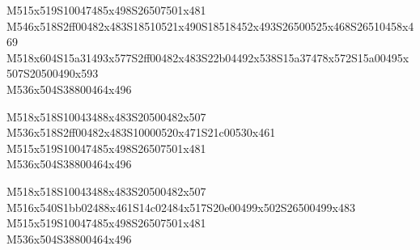 \documentclass{article}
\begin{document}
\begin{multicols}{5}
\begin{center}
M515x519S10047485x498S26507501x481 %
\\M546x518S2ff00482x483S18510521x490S18518452x493S26500525x468S26510458x469 %
\\M518x604S15a31493x577S2ff00482x483S22b04492x538S15a37478x572S15a00495x507S20500490x593 %
\\M536x504S38800464x496 %

M518x518S10043488x483S20500482x507 %
\\M536x518S2ff00482x483S10000520x471S21c00530x461 %
\\M515x519S10047485x498S26507501x481 %
\\M536x504S38800464x496 %

M518x518S10043488x483S20500482x507 %
\\M516x540S1bb02488x461S14c02484x517S20e00499x502S26500499x483 %
\\M515x519S10047485x498S26507501x481 %
\\M536x504S38800464x496 %
\end{center}
\end{multicols}
\end{document}
